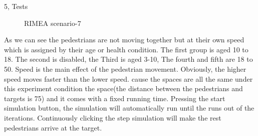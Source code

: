 \begin{task}{5, Tests}
\begin{figure}[H]
\caption{RIMEA scenario-7}
\end{figure}
As we can see the pedestrians are not moving together but at their own speed which is assigned by their age or health condition. The first group is aged 10 to 18. The second is disabled, the Third is aged 3-10, The fourth and fifth are 18 to 50. Speed is the main effect of the pedestrian movement. Obviously, the higher speed moves faster than the lower speed. cause the spaces are all the same under this experiment condition the space(the distance between the pedestrians and targets is 75) and it comes with a fixed running time. Pressing the start simulation button, the simulation will automatically run until the runs out of the iterations. Continuously clicking the step simulation will make the rest pedestrians arrive at the target.
\end{task}